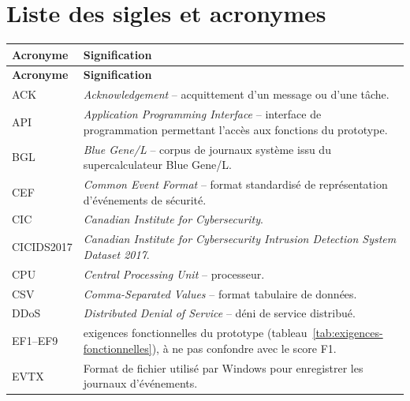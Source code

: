 \chapter*{Liste des sigles et acronymes}

\begin{longtable}{p{3.2cm}p{11.2cm}}

\textbf{Acronyme} & \textbf{Signification} \\
\toprule
\endfirsthead

\textbf{Acronyme} & \textbf{Signification} \\
\toprule
\endhead

ACK &
\textit{Acknowledgement} -- acquittement d'un message ou d'une tâche. \\

API &
\textit{Application Programming Interface} -- interface de programmation
permettant l'accès aux fonctions du prototype. \\

BGL &
\textit{Blue Gene/L} -- corpus de journaux système issu du supercalculateur
Blue Gene/L. \\

CEF &
\textit{Common Event Format} -- format standardisé de représentation
d'événements de sécurité. \\

CIC &
\textit{Canadian Institute for Cybersecurity}. \\

CICIDS2017 &
\textit{Canadian Institute for Cybersecurity Intrusion Detection System
Dataset 2017}. \\

CPU &
\textit{Central Processing Unit} -- processeur. \\

CSV &
\textit{Comma-Separated Values} -- format tabulaire de données. \\

DDoS &
\textit{Distributed Denial of Service} -- déni de service distribué. \\

EF1--EF9 &
exigences fonctionnelles du prototype (tableau~\ref{tab:exigences-fonctionnelles}), à ne pas confondre avec le score F1. \\

EVTX &
Format de fichier utilisé par Windows pour enregistrer les journaux
d'événements. \\


\end{longtable}
